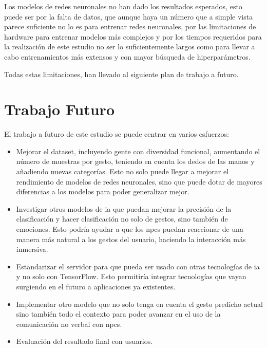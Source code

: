 Los modelos de redes neuronales no han dado los resultados esperados, esto puede ser por la falta de datos, que aunque haya un número que a simple vista parece suficiente no lo es para entrenar redes neuronales, por las limitaciones de hardware para entrenar modelos más complejos y por los tiempos requeridos para la realización de este estudio no ser lo suficientemente largos como para llevar a cabo entrenamientos más extensos y con mayor búsqueda de hiperparámetros.

Todas estas limitaciones, han llevado al siguiente plan de trabajo a futuro.


\section{Trabajo Futuro}

El trabajo a futuro de este estudio se puede centrar en varios esfuerzos:
\begin{itemize}
    \item Mejorar el dataset, incluyendo gente con diversidad funcional, aumentando el número de muestras por gesto, teniendo en cuenta los dedos de las manos y añadiendo nuevas categorías. Esto no solo puede llegar a mejorar el rendimiento de modelos de redes neuronales, sino que puede dotar de mayores diferencias a los modelos para poder generalizar mejor.
    \item Investigar otros modelos de \gls{ia} que puedan mejorar la precisión de la clasificación y hacer clasificación no solo de gestos, sino también de emociones. Esto podría ayudar a que los \glspl{npc} puedan reaccionar de una manera más natural a los gestos del usuario, haciendo la interacción más inmersiva.
    \item Estandarizar el servidor para que pueda ser usado con otras tecnologías de \gls{ia} y no solo con TensorFlow. Esto permitiría integrar tecnologías que vayan surgiendo en el futuro a aplicaciones ya existentes.
    \item Implementar otro modelo que no solo tenga en cuenta el gesto predicho actual sino también todo el contexto para poder avanzar en el uso de la comunicación no verbal con \glspl{npc}.
    \item Evaluación del resultado final con usuarios.
\end{itemize}



